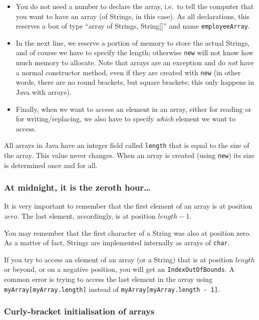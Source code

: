 \begin{itemize}
\item You do not need a number to declare the array, i.e.~to tell the
  computer that you want to have an array (of Strings, in this
  case). As all declarations, this reserves a box of type ``array of
  Strings, String[]'' and name \verb+employeeArray+.
\item In the next line, we reserve a portion of memory to store the
  actual Strings, and of course we have to specify the length;
  otherwise \verb+new+ will not know how much memory to allocate. Note
  that arrays are an exception and do \emph{not} have a normal
  constructor method, even if they are created with \verb+new+ (in
  other words, there are no round brackets, but square brackets; this
  only happens in Java with arrays). 
\item Finally, when we want to access an element in an array, either
  for reading or for writing/replacing, we also have to specify
  \emph{which} element we want to access.
\end{itemize}

All arrays in Java have an integer field called \verb+length+ that is equal to
the size of the array. This value never changes. When an array is
created (using \verb+new+) its size is determined once and for all. 

\subsubsection*{At midnight, it is the zeroth hour\ldots}
\label{sec:at-midnight-it}

It is very important to remember that the first element of an array is
at position $zero$. The last element, accordingly, is at position 
$length - 1$. 

You may remember that the first character of a String was also at
position zero. As a matter of fact, Strings are implemented internally
as arrays of \verb+char+. 

If you try to access an element of an array (or a String) that is at
position $length$ or beyond, or on a negative position, you will get
an \verb+IndexOutOfBounds+. A common error is trying to
access the last element in the array using
\verb+myArray[myArray.length]+ instead 
of \verb+myArray[myArray.length - 1]+.

\subsubsection*{Curly-bracket initialisation of arrays}
\label{sec:curly-brack-init}

